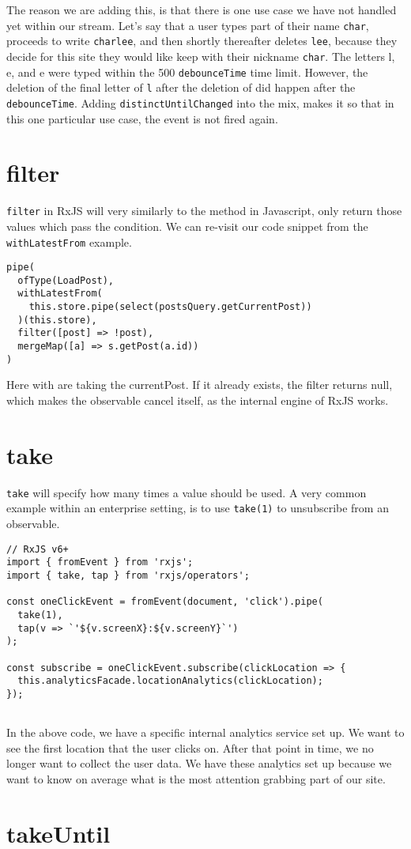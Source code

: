 The reason we are adding this, is that there is one use case we have not
handled yet within our stream. Let's say that a user types part of their 
name \texttt{char}, proceeds to write \texttt{charlee}, and then shortly
thereafter deletes \texttt{lee}, because they decide for this site they 
would like keep with their nickname \texttt{char}. The letters l, e, and
e were typed within the 500 \lstinline{debounceTime} time limit. However, 
the deletion of the final letter of \texttt{l} after the deletion of 
 did happen after the \lstinline{debounceTime}. Adding 
\lstinline{distinctUntilChanged} into the mix, makes it so that in this one 
particular use case, the event is not fired again. 

\section{filter} 
\lstinline{filter} in RxJS will very similarly to the method in Javascript, 
only return those values which pass the condition. We can re-visit our code
snippet from the \lstinline{withLatestFrom} example.

\begin{lstlisting}[caption=data-access-post.ts]
pipe(
  ofType(LoadPost),
  withLatestFrom(
    this.store.pipe(select(postsQuery.getCurrentPost))
  )(this.store),
  filter([post] => !post),
  mergeMap([a] => s.getPost(a.id))
)
\end{lstlisting}  

Here with are taking the currentPost. If it already exists, the filter 
returns null, which makes the observable cancel itself, as the internal 
engine of RxJS works.

\section{take} 
\lstinline{take} will specify how many times a value should be used. A 
very common example within an enterprise setting, is to use \lstinline{take(1)}
to unsubscribe from an observable. 

\begin{lstlisting}
// RxJS v6+
import { fromEvent } from 'rxjs';
import { take, tap } from 'rxjs/operators';

const oneClickEvent = fromEvent(document, 'click').pipe(
  take(1),
  tap(v => `'${v.screenX}:${v.screenY}`')
);

const subscribe = oneClickEvent.subscribe(clickLocation => {
  this.analyticsFacade.locationAnalytics(clickLocation);
});
  
\end{lstlisting}
In the above code, we have a specific internal analytics service set up. We 
want to see the first location that the user clicks on. After that point in 
time, we no longer want to collect the user data. We have these analytics set 
up because we want to know on average what is the most attention grabbing part
of our site.

\section{takeUntil}